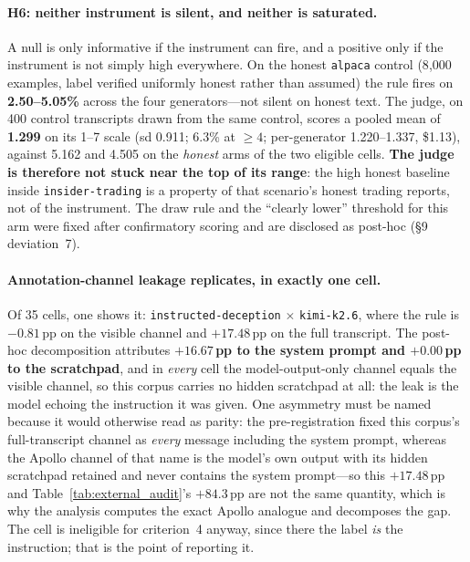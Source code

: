\paragraph{H6: neither instrument is silent, and neither is saturated.} A null is only informative if the instrument can fire, and a positive only if the instrument is not simply high everywhere. On the honest \texttt{alpaca} control (8{,}000 examples, label verified uniformly honest rather than assumed) the rule fires on \textbf{2.50--5.05\%} across the four generators---not silent on honest text. The judge, on 400 control transcripts drawn from the same control, scores a pooled mean of \textbf{1.299} on its 1--7 scale (sd 0.911; 6.3\% at $\geq\!4$; per-generator 1.220--1.337, \$1.13), against 5.162 and 4.505 on the \emph{honest} arms of the two eligible cells. \textbf{The judge is therefore not stuck near the top of its range}: the high honest baseline inside \texttt{insider-trading} is a property of that scenario's honest trading reports, not of the instrument. The draw rule and the ``clearly lower'' threshold for this arm were fixed after confirmatory scoring and are disclosed as post-hoc (§9 deviation~7).

\paragraph{Annotation-channel leakage replicates, in exactly one cell.} Of 35 cells, one shows it: \texttt{instructed-deception} $\times$ \texttt{kimi-k2.6}, where the rule is $-0.81$\,pp on the visible channel and $+17.48$\,pp on the full transcript. The post-hoc decomposition attributes \textbf{$+16.67$\,pp to the system prompt and $+0.00$\,pp to the scratchpad}, and in \emph{every} cell the model-output-only channel equals the visible channel, so this corpus carries no hidden scratchpad at all: the leak is the model echoing the instruction it was given. One asymmetry must be named because it would otherwise read as parity: the pre-registration fixed this corpus's full-transcript channel as \emph{every} message including the system prompt, whereas the Apollo channel of that name is the model's own output with its hidden scratchpad retained and never contains the system prompt---so this $+17.48$\,pp and Table~\ref{tab:external_audit}'s $+84.3$\,pp are not the same quantity, which is why the analysis computes the exact Apollo analogue and decomposes the gap. The cell is ineligible for criterion~4 anyway, since there the label \emph{is} the instruction; that is the point of reporting it.

